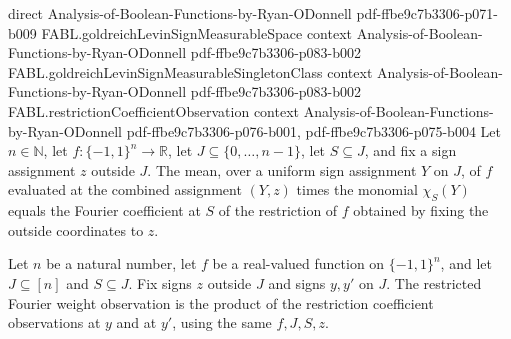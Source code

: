 \begin{theorem}
  {direct}
  {Analysis-of-Boolean-Functions-by-Ryan-ODonnell}
  {pdf-ffbe9c7b3306-p071-b009}
\proofstep
  {FABL.goldreichLevinSignMeasurableSpace}
  {context}
  {Analysis-of-Boolean-Functions-by-Ryan-ODonnell}
  {pdf-ffbe9c7b3306-p083-b002}
\proofstep
  {FABL.goldreichLevinSignMeasurableSingletonClass}
  {context}
  {Analysis-of-Boolean-Functions-by-Ryan-ODonnell}
  {pdf-ffbe9c7b3306-p083-b002}
\proofstep
  {FABL.restrictionCoefficientObservation}
  {context}
  {Analysis-of-Boolean-Functions-by-Ryan-ODonnell}
  {pdf-ffbe9c7b3306-p076-b001,
    pdf-ffbe9c7b3306-p075-b004}
Let $n\in\mathbb N$, let $f:\{−1,1\}^n\to\mathbb R$, let $J\subseteq\{0,\ldots,n-1\}$,
let $S\subseteq J$, and fix a sign assignment $z$ outside $J$. The mean, over a uniform
sign assignment $Y$ on $J$, of $f$ evaluated at the combined assignment $(Y,z)$ times
the monomial $\chi_S(Y)$ equals the Fourier coefficient at $S$ of the restriction of $f$
obtained by fixing the outside coordinates to $z$.
\end{theorem}

\begin{definition}
\label{FABL.restrictedFourierWeightObservation}
\leanok
{}
Let $n$ be a natural number, let $f$ be a real-valued function on $\{−1,1\}^n$, and
let $J\subseteq[n]$ and $S\subseteq J$. Fix signs $z$ outside $J$ and signs $y,y'$ on
$J$. The restricted Fourier weight observation is the product of the restriction
coefficient observations at $y$ and at $y'$, using the same $f,J,S,z$.
\end{definition}

